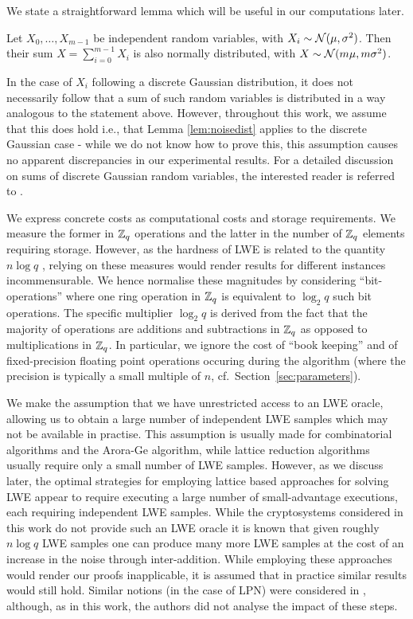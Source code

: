 We state a straightforward lemma which will be useful in our computations later.
\begin{lemma}\label{lem:noisedist}
Let $X_0,\ldots,X_{m-1}$ be independent random variables, with $X_i \sim \mathcal{N}({\mu, \sigma^2)}$. 
Then their sum $X = \sum_{i=0}^{m-1} X_i$ is also normally distributed, with $X \sim \mathcal{N}({m\mu, m \sigma^2)}$.
\end{lemma}
In the case of $X_i$ following a discrete Gaussian distribution, it does not necessarily follow that a sum of such random variables is distributed in a way analogous to the statement above. However, throughout this work, we assume that this does hold i.e., that Lemma \ref{lem:noisedist} applies to the discrete Gaussian case - while we do not know how to prove this, this assumption causes no apparent discrepancies in our experimental results. For a detailed discussion on sums of discrete Gaussian random variables, the interested reader is referred to \cite{agrawal-gentry-halevi-sahai:eprint2012}. 

 We express concrete costs as computational costs and storage requirements. We measure the former in $\mathbb{Z}_q$ operations and the latter in the number of $\mathbb{Z}_q$ elements requiring storage. However, as the hardness of LWE is related to the quantity $n\log q$ \cite{brakerski-langlois-peikert-regev-stehle:stoc13}, relying on these measures would render results for different instances incommensurable. We hence normalise these magnitudes by considering ``bit-operations'' where one ring operation in $\mathbb{Z}_q$ is equivalent to $\log_2 q$ such bit operations. The specific multiplier $\log_2 q$ is derived from the fact that the majority of operations are additions and subtractions in $\mathbb{Z}_q$ as opposed to multiplications in $\mathbb{Z}_q$. In particular, we ignore the cost of ``book keeping'' and of fixed-precision floating point operations occuring during the algorithm (where the precision is typically a small multiple of $n$, cf.\ Section~\ref{sec:parameters}).

We make the assumption that we have unrestricted access to an LWE oracle, allowing us to obtain a large number of independent LWE samples which may not be available in practise. This assumption is usually made for combinatorial algorithms and the Arora-Ge algorithm, while lattice reduction algorithms usually require only a small number of LWE samples. However, as we discuss later, the optimal strategies for employing lattice based approaches for solving LWE appear to require executing a large number of small-advantage executions, each requiring independent LWE samples. While the cryptosystems considered in this work do not provide such an LWE oracle it is known \cite{DBLP:conf/coco/Regev10} that given roughly $n\log q$ LWE samples one can produce many more LWE samples at the cost of an increase in the noise through inter-addition. While employing these approaches would render our proofs inapplicable, it is assumed that in practice similar results would still hold. Similar notions (in the case of LPN) were considered in \cite{FL06}, although, as in this work, the authors did not analyse the impact of these steps.

